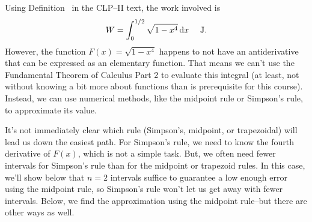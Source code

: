 \begin{solution}
Using Definition~ in the CLP--II text, the work involved is
\[W = \int_{0}^{1/2} \sqrt{1-x^4}\,\mathrm{d}x \quad\text{ J}.\]
However, the function $F(x)=\sqrt{1-x^4}$ happens to not have an antiderivative that can be expressed as an elementary function. That means we can't use the Fundamental Theorem of Calculus Part 2 to evaluate this integral (at least, not without knowing a bit more about functions than is prerequisite for this course). Instead, we can use numerical methods, like the midpoint rule or Simpson's rule, to approximate its value.

It's not immediately clear which rule (Simpson's, midpoint, or trapezoidal) will lead us down the easiest path. For Simpson's rule, we need to know the fourth derivative of $F(x)$, which is not a simple task. But, we often need fewer intervals for Simpson's rule than for the midpoint or trapezoid rules. In this case, we'll show below that  $n = 2$ intervals  suffice to guarantee a low enough error using the midpoint rule, so Simpson's rule won't let us get away with fewer intervals. Below, we find the approximation using the midpoint rule--but there are other ways as well.


\end{solution}
